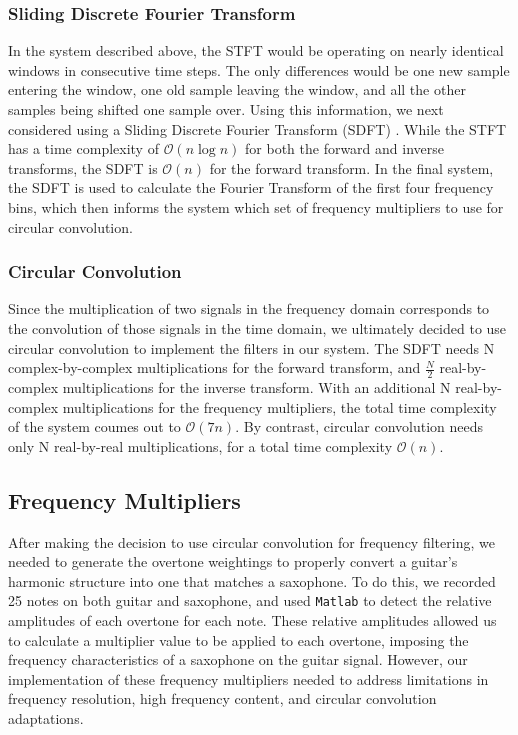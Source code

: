 \documentclass[twoside,a4paper]{article}
\begin{document}
\subsubsection{Sliding Discrete Fourier Transform}
In the system described above, the STFT would be operating on nearly identical
windows in consecutive time steps. The only differences would be one new sample
entering the window, one old sample leaving the window, and all the other samples
being shifted one sample over. Using this information, we next considered using a
Sliding Discrete Fourier Transform (SDFT) \cite{SDFT}. While the STFT has a time complexity
of $\mathcal{O}(n\log{}n)$ for both the forward and inverse transforms,
the SDFT is $\mathcal{O}(n)$ for the forward transform. In the final system, the SDFT is used to calculate the
Fourier Transform of the first four frequency bins, which then informs the system which set
of frequency multipliers to use for circular convolution.

\subsubsection{Circular Convolution}
Since the multiplication of two signals in the frequency domain
corresponds to the convolution of those signals in the time domain,
we ultimately decided to use circular convolution to implement the
filters in our system. The SDFT needs N complex-by-complex multiplications
for the forward transform, and $\frac{N}{2}$ real-by-complex multiplications
for the inverse transform. With an additional N real-by-complex multiplications
for the frequency multipliers, the total time complexity of the system coumes out to
$\mathcal{O}(7n)$. By contrast, circular convolution needs only N real-by-real
multiplications, for a total time complexity $\mathcal{O}(n)$.

\subsection{Frequency Multipliers}
After making the decision to use circular convolution for frequency filtering, we needed to generate
the overtone weightings to properly convert a guitar's harmonic
structure into one that matches a saxophone. To do this, we recorded
25 notes on both guitar and saxophone, and used \texttt{Matlab} to detect the
relative amplitudes of each overtone for each note. These relative
amplitudes allowed us to calculate a multiplier value to be applied to
each overtone, imposing the frequency characteristics of a saxophone on
the guitar signal. However, our implementation of these frequency multipliers
needed to address limitations in frequency resolution, high frequency content,
and circular convolution adaptations.
\end{document}
